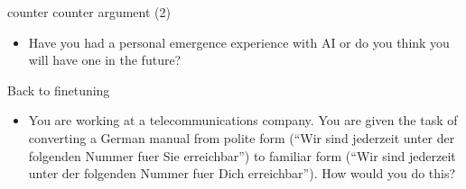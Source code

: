 \documentclass[11pt,compress,t,notes=noshow, xcolor=table]{beamer}
\begin{document}
\begin{frame}{counter counter argument (2)}

\vfill

%
\begin{itemize}
\item \ques Have you had a personal emergence experience
  with AI or do you think you will have one in the future?



%
\end{itemize}


\vfill

\end{frame}

\begin{frame}{Back to finetuning}

\vfill

%
\begin{itemize}
\item \ques You are working at a telecommunications
company. You are given the task of converting a German manual from
polite form (``Wir sind jederzeit unter der folgenden
Nummer fuer Sie erreichbar'') to familiar form
(``Wir sind jederzeit unter der folgenden
Nummer fuer Dich erreichbar''). How would you do this?

\end{itemize}


\vfill

\end{frame}









\endlecture
\end{document}
